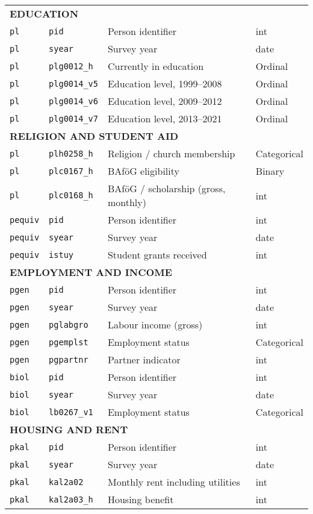 {\begin{longtable}{llll}
\midrule
\multicolumn{4}{l}{\textbf{EDUCATION}} \\
\texttt{pl} & \texttt{pid} & Person identifier & int \\
\texttt{pl} & \texttt{syear} & Survey year & date \\
\texttt{pl} & \texttt{plg0012\_h} & Currently in education & Ordinal \\
\texttt{pl} & \texttt{plg0014\_v5} & Education level, 1999--2008 & Ordinal \\
\texttt{pl} & \texttt{plg0014\_v6} & Education level, 2009--2012 & Ordinal \\
\texttt{pl} & \texttt{plg0014\_v7} & Education level, 2013--2021 & Ordinal \\

\midrule
\multicolumn{4}{l}{\textbf{RELIGION AND STUDENT AID}} \\
\texttt{pl} & \texttt{plh0258\_h} & Religion / church membership & Categorical \\
\texttt{pl} & \texttt{plc0167\_h} & BAföG eligibility & Binary \\
\texttt{pl} & \texttt{plc0168\_h} & BAföG / scholarship (gross, monthly) & int \\
\texttt{pequiv} & \texttt{pid} & Person identifier & int \\
\texttt{pequiv} & \texttt{syear} & Survey year & date \\
\texttt{pequiv} & \texttt{istuy} & Student grants received & int \\

\midrule
\multicolumn{4}{l}{\textbf{EMPLOYMENT AND INCOME}} \\
\texttt{pgen} & \texttt{pid} & Person identifier & int \\
\texttt{pgen} & \texttt{syear} & Survey year & date \\
\texttt{pgen} & \texttt{pglabgro} & Labour income (gross) & int \\
\texttt{pgen} & \texttt{pgemplst} & Employment status & Categorical \\
\texttt{pgen} & \texttt{pgpartnr} & Partner indicator & int \\
\texttt{biol} & \texttt{pid} & Person identifier & int \\
\texttt{biol} & \texttt{syear} & Survey year & date \\
\texttt{biol} & \texttt{lb0267\_v1} & Employment status & Categorical \\

\midrule
\multicolumn{4}{l}{\textbf{HOUSING AND RENT}} \\
\texttt{pkal} & \texttt{pid} & Person identifier & int \\
\texttt{pkal} & \texttt{syear} & Survey year & date \\
\texttt{pkal} & \texttt{kal2a02} & Monthly rent including utilities & int \\
\texttt{pkal} & \texttt{kal2a03\_h} & Housing benefit & int \\


\end{longtable}}
